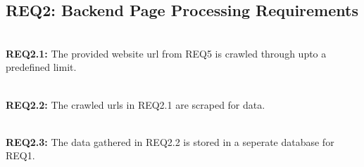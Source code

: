 \subsection{REQ2: Backend Page Processing Requirements}


\textbf{\\REQ2.1:} The provided website url from REQ5 is crawled  through upto a predefined limit.\par

\textbf{\\REQ2.2:} The crawled urls in REQ2.1 are scraped for data.\par

\textbf{\\REQ2.3:} The data gathered in REQ2.2 is stored in a seperate database for REQ1.\par


